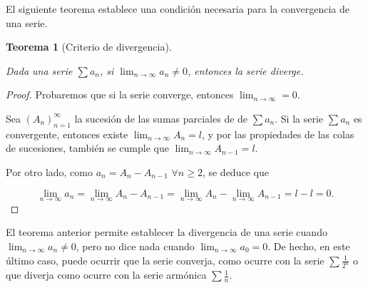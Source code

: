 \documentclass[
  a4paper,
]{scrreport}
\theoremstyle{definition}
\theoremstyle{plain}
\theoremstyle{definition}
\theoremstyle{definition}
\theoremstyle{plain}
\newtheorem{theorem}{Teorema}[chapter]
\theoremstyle{plain}
\theoremstyle{remark}
\begin{document}
El siguiente teorema establece una condición necesaria para la
convergencia de una serie.

\begin{theorem}[Criterio de
divergencia]\protect\hypertarget{thm-criterio-divergencia-series}{}\label{thm-criterio-divergencia-series}

Dada una serie \(\sum a_n\), si \(\lim_{n\to\infty} a_n \neq 0\),
entonces la serie diverge.

\end{theorem}

\begin{tcolorbox}[enhanced jigsaw, leftrule=.75mm, colbacktitle=quarto-callout-note-color!10!white, toprule=.15mm, opacityback=0, opacitybacktitle=0.6, toptitle=1mm, breakable, bottomtitle=1mm, colframe=quarto-callout-note-color-frame, rightrule=.15mm, titlerule=0mm, title=\textcolor{quarto-callout-note-color}{\faInfo}\hspace{0.5em}{Demostración}, arc=.35mm, left=2mm, bottomrule=.15mm, colback=white, coltitle=black]

\begin{proof}
Probaremos que si la serie converge, entonces \(\lim_{n\to\infty}=0\).

Sea \((A_n)_{n=1}^\infty\) la sucesión de las sumas parciales de de
\(\sum a_n\). Si la serie \(\sum a_n\) es convergente, entonces existe
\(\lim_{n\to\infty}A_n=l\), y por las propiedades de las colas de
sucesiones, también se cumple que \(\lim_{n\to\infty}A_{n-1}=l\).

Por otro lado, como \(a_n=A_n-A_{n-1}\) \(\forall n\geq 2\), se deduce
que

\[
\lim_{n\to\infty}a_n =\lim_{n\to\infty}A_n-A_{n-1} = \lim_{n\to\infty}A_n-\lim_{n\to\infty}A_{n-1}=l-l=0.
\]
\end{proof}

\end{tcolorbox}

\begin{tcolorbox}[enhanced jigsaw, leftrule=.75mm, colbacktitle=quarto-callout-warning-color!10!white, toprule=.15mm, opacityback=0, opacitybacktitle=0.6, toptitle=1mm, breakable, bottomtitle=1mm, colframe=quarto-callout-warning-color-frame, rightrule=.15mm, titlerule=0mm, title=\textcolor{quarto-callout-warning-color}{\faExclamationTriangle}\hspace{0.5em}{Advertencia}, arc=.35mm, left=2mm, bottomrule=.15mm, colback=white, coltitle=black]

El teorema anterior permite establecer la divergencia de una serie
cuando \(\lim_{n\to\infty} a_n \neq 0\), pero no dice nada cuando
\(\lim_{n\to\infty} a_0 = 0\). De hecho, en este último caso, puede
ocurrir que la serie converja, como ocurre con la serie
\(\sum \frac{1}{2^n}\) o que diverja como ocurre con la serie armónica
\(\sum \frac{1}{n}\).

\end{tcolorbox}
\end{document}

